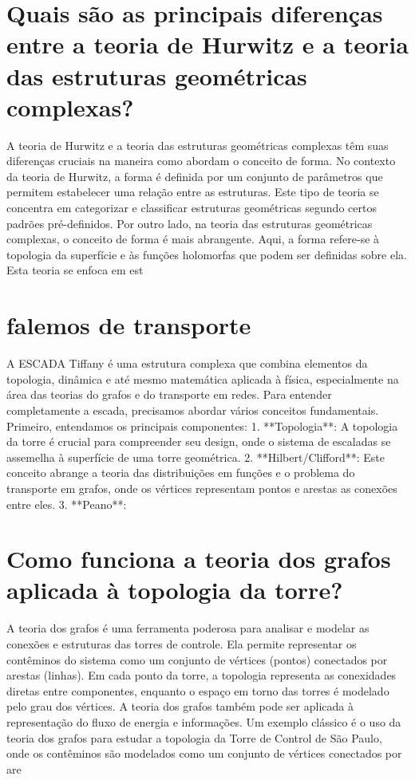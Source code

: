 \documentclass[11pt,a4paper]{article}
\begin{document}
\section{Quais são as principais diferenças entre a teoria de Hurwitz e a teoria das estruturas geométricas complexas?}
A teoria de Hurwitz e a teoria das estruturas geométricas complexas têm suas diferenças cruciais na maneira como abordam o conceito de forma. No contexto da teoria de Hurwitz, a forma é definida por um conjunto de parâmetros que permitem estabelecer uma relação entre as estruturas. Este tipo de teoria se concentra em categorizar e classificar estruturas geométricas segundo certos padrões pré-definidos. Por outro lado, na teoria das estruturas geométricas complexas, o conceito de forma é mais abrangente. Aqui, a forma refere-se à topologia da superfície e às funções holomorfas que podem ser definidas sobre ela. Esta teoria se enfoca em est

\section{falemos de transporte}
A ESCADA Tiffany é uma estrutura complexa que combina elementos da topologia, dinâmica e até mesmo matemática aplicada à física, especialmente na área das teorias do grafos e do transporte em redes. Para entender completamente a escada, precisamos abordar vários conceitos fundamentais. Primeiro, entendamos os principais componentes: 1. **Topologia**: A topologia da torre é crucial para compreender seu design, onde o sistema de escaladas se assemelha à superfície de uma torre geométrica. 2. **Hilbert/Clifford**: Este conceito abrange a teoria das distribuições em funções e o problema do transporte em grafos, onde os vértices representam pontos e arestas as conexões entre eles. 3. **Peano**:

\section{Como funciona a teoria dos grafos aplicada à topologia da torre?}
A teoria dos grafos é uma ferramenta poderosa para analisar e modelar as conexões e estruturas das torres de controle. Ela permite representar os contêminos do sistema como um conjunto de vértices (pontos) conectados por arestas (linhas). Em cada ponto da torre, a topologia representa as conexidades diretas entre componentes, enquanto o espaço em torno das torres é modelado pelo grau dos vértices. A teoria dos grafos também pode ser aplicada à representação do fluxo de energia e informações. Um exemplo clássico é o uso da teoria dos grafos para estudar a topologia da Torre de Control de São Paulo, onde os contêminos são modelados como um conjunto de vértices conectados por are
\end{document}
